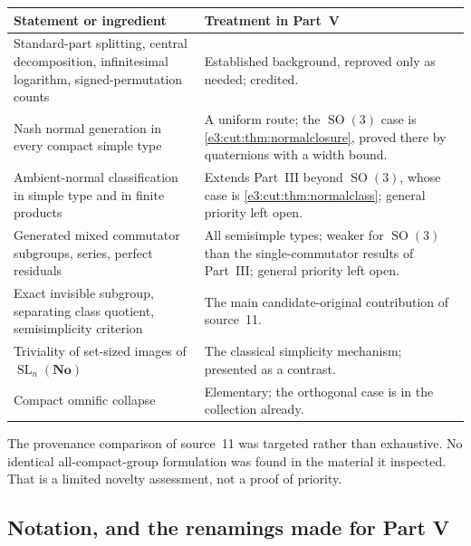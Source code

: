 \documentclass[11pt,letterpaper]{article}
\numberwithin{equation}{section}
\theoremstyle{definition}
\theoremstyle{remark}
\newcommand{\No}{\mathbf{No}}
\newcommand{\SO}{\operatorname{SO}}
\newcommand{\SL}{\operatorname{SL}}
\begin{document}
\begin{center}\small
\begin{tabular}{L{0.36\textwidth}L{0.54\textwidth}}
\toprule
Statement or ingredient & Treatment in Part~V\\
\midrule
Standard-part splitting, central decomposition, infinitesimal logarithm,
signed-permutation counts & Established background, reproved only as
needed; credited.\\
Nash normal generation in every compact simple type & A uniform route; the
$\SO(3)$ case is \cref{e3:cut:thm:normalclosure}, proved there by quaternions
with a width bound.\\
Ambient-normal classification in simple type and in finite products & Extends
Part~III beyond $\SO(3)$, whose case is \cref{e3:cut:thm:normalclass}; general
priority left open.\\
Generated mixed commutator subgroups, series, perfect residuals & All
semisimple types; weaker for $\SO(3)$ than the single-commutator results of
Part~III; general priority left open.\\
Exact invisible subgroup, separating class quotient, semisimplicity criterion
& The main candidate-original contribution of source~11.\\
Triviality of set-sized images of $\SL_n(\No)$ & The classical simplicity
mechanism; presented as a contrast.\\
Compact omnific collapse & Elementary; the orthogonal case is in the
collection already.\\
\bottomrule
\end{tabular}
\end{center}

The provenance comparison of source~11 was targeted rather than exhaustive. No
identical all-compact-group formulation was found in the material it inspected.
That is a limited novelty assessment, not a proof of priority.

\subsection{Notation, and the renamings made for Part V}\label{e3:cpt:sub:notation}
\end{document}
